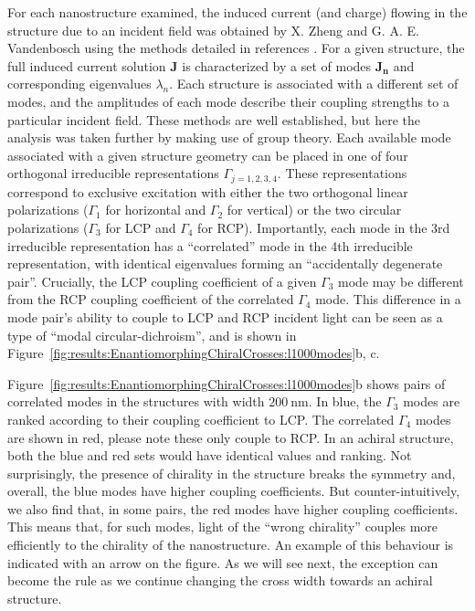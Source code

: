For each nanostructure examined, the induced current (and charge) flowing in the structure due to an incident field was obtained by X. Zheng and G. A. E. Vandenbosch using the methods detailed in references \cite{Collins2018, Zheng2012}. For a given structure, the full induced current solution $\mathbf{J}$ is characterized by a set of modes $\mathbf{J_n}$ and corresponding eigenvalues $\lambda_{n}$. Each structure is associated with a different set of modes, and the amplitudes of each mode describe their coupling strengths to a particular incident field.
These methods are well established, but here the analysis was taken further by making use of group theory. Each available mode associated with a given structure geometry can be placed in one of four orthogonal irreducible representations $\Gamma _{j = 1,2,3,4}$. These representations correspond to exclusive excitation with either the two orthogonal linear polarizations ($\Gamma _{1}$ for horizontal and $\Gamma _{2}$ for vertical) or the two circular polarizations ($\Gamma _{3}$ for LCP and $\Gamma _{4}$ for RCP). 
Importantly, each mode in the 3rd irreducible representation has a “correlated” mode in the 4th irreducible representation, with identical eigenvalues forming an ``accidentally degenerate pair''. 
Crucially, the LCP coupling coefficient of a given $\Gamma _{3}$ mode may be different from the RCP coupling coefficient of the correlated $\Gamma _{4}$ mode. 
This difference in a mode pair’s ability to couple to LCP and RCP incident light can be seen as a type of “modal circular-dichroism”, and is shown in Figure~\ref{fig:results:EnantiomorphingChiralCrosses:l1000modes}b, c. 

Figure~\ref{fig:results:EnantiomorphingChiralCrosses:l1000modes}b shows pairs of correlated modes in the structures with width $\SI{200}{\nano\m}$. In blue, the $\Gamma _{3}$ modes are ranked according to their coupling coefficient to LCP. The correlated $\Gamma _{4}$ modes are shown in red, please note these only couple to RCP. In an achiral structure, both the blue and red sets would have identical values and ranking. Not surprisingly, the presence of chirality in the structure breaks the symmetry and, overall, the blue modes have higher coupling coefficients. 
But counter-intuitively, we also find that, in some pairs, the red modes have higher coupling coefficients. This means that, for such modes, light of the ``wrong chirality'' couples more efficiently to the chirality of the nanostructure. An example of this behaviour is indicated with an arrow on the figure. As we will see next, the exception can become the rule as we continue changing the cross width towards an achiral structure.

